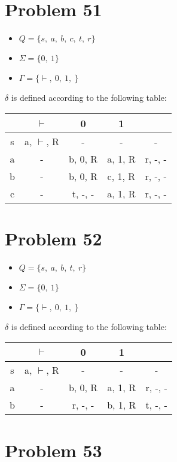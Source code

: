 \documentclass[11pt]{article}
\begin{document}
\section*{Problem 51}

\begin{itemize}
	\item $Q = \{ s,\ a,\ b,\ c,\ t,\ r \}$
	\item $\Sigma = \{0,\ 1\}$
	\item $\Gamma = \{ \vdash,\ 0,\ 1,\ $\textvisiblespace$\}$
\end{itemize}

$\delta$ is defined according to the following table:


\begin{tabular}{ c | c | c | c | c }
			& $\vdash$				& 0 					& 1				& \textvisiblespace \\
		\hline
		s	& a, $\vdash$, R		& -					& -				& - \\
		a	& -							& b, 0, R			& a, 1, R		& r, -, - \\
		b	& -							& b, 0, R			& c, 1, R		& r, -, - \\
		c	& -							& t, -, -				& a, 1, R		& r, -, -
\end{tabular}


\section*{Problem 52}

\begin{itemize}
	\item $Q = \{ s,\ a,\ b,\ t,\ r \}$
	\item $\Sigma = \{0,\ 1\}$
	\item $\Gamma = \{ \vdash,\ 0,\ 1,\ $\textvisiblespace$\}$
\end{itemize}

$\delta$ is defined according to the following table:


\begin{tabular}{ c | c | c | c | c }
			& $\vdash$				& 0 					& 1				& \textvisiblespace \\
		\hline
		s	& a, $\vdash$, R		& -					& -				& - \\
		a	& -							& b, 0, R			& a, 1, R		& r, -, - \\
		b	& -							& r, -, -				& b, 1, R		& t, -, - \\
\end{tabular}


\section*{Problem 53}
\end{document}
